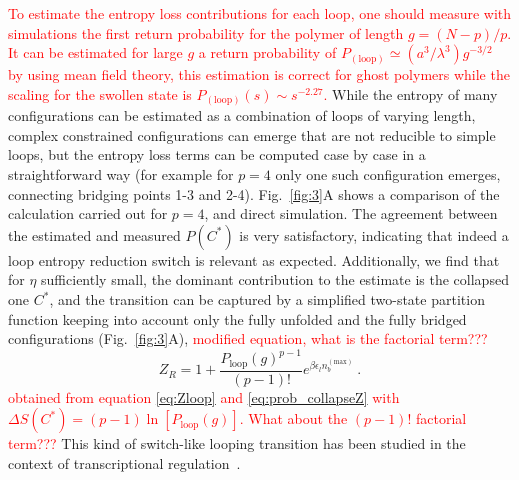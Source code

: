\documentclass[
preprint,
a4paper,
12pt,
superscriptaddress,
pre]{revtex4}
\newcommand{\rev}[1]{\textcolor{red}{#1}}
\begin{document}
\rev{
To estimate the entropy loss contributions for each loop, one should
measure with simulations the first return probability for the polymer
of length $g = (N-p)/p$. It can be estimated for
large $g$ a return probability of $P_\mathrm{(loop)} \simeq
(a^3/\lambda^3) g^{-3/2}$ by using mean field theory, this estimation
is correct for ghost polymers while the scaling for the swollen state
is $P_\mathrm{(loop)}(s) \sim s^{-2.27}$\cite{Marenduzzo2006c}.
%
}
While the entropy of many configurations can be estimated as a
combination of loops of varying length, complex constrained
configurations can emerge that are not reducible to simple loops, but
the entropy loss terms can be computed case by case in a
straightforward way (for example for $p=4$ only one such configuration
emerges, connecting bridging points 1-3 and 2-4).  Fig.~\ref{fig:3}A
shows a comparison of the calculation carried out for $p=4$, and
direct simulation.  The agreement between the estimated and measured
$P(C^*)$ is very satisfactory, indicating that indeed a loop entropy
reduction switch is relevant as expected.
%
Additionally, we find that for $\eta$ sufficiently small, the
dominant contribution to the estimate is the collapsed one $C^*$, and
the transition can be captured by a simplified two-state partition
function keeping into account only the fully unfolded and the fully
bridged configurations (Fig.~\ref{fig:3}A),
\rev{modified equation, what is the factorial term???}
%
%
\begin{equation}
  Z_R = 1 + \frac{P_\mathrm{loop}(g)^{p-1}}
                  {(p-1)!}
            e^{\beta \epsilon_l n_b^{\mathrm{(max)}}} \ .
  \label{eq:Zloop_red}
\end{equation}
\rev{obtained from equation \ref{eq:Zloop} and \ref{eq:prob_collapseZ} with
$\Delta S(C^*) = (p - 1)\ln\left[ P_\mathrm{loop}(g)\right]$. What
about the $(p-1)!$ factorial term???}
This kind of switch-like looping transition has been studied in the
context of transcriptional regulation~\cite{Saiz2006a}.
\end{document}
